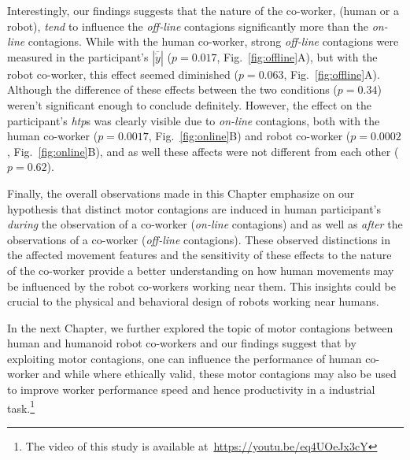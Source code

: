 Interestingly, our findings suggests that the nature of the co-worker, (human or a robot), \textit{tend} to influence the \textit{off-line} contagions significantly more than the \textit{on-line} contagions. While with the human co-worker, strong \textit{off-line} contagions were measured in the participant's $|\overline{\dot{y}}|$ ($p = 0.017$, Fig.~\ref{fig:offline}A), but with the robot co-worker, this effect seemed diminished ($p = 0.063$, Fig.~\ref{fig:offline}A). Although the difference of these effects between the two conditions ($p = 0.34$) weren't significant enough to conclude definitely. However, the effect on the participant's {\it htp}s was clearly visible due to \textit{on-line} contagions, both with the human co-worker ($p = 0.0017$, Fig.~\ref{fig:online}B) and robot co-worker ($p = 0.0002$, Fig.~\ref{fig:online}B), and as well these affects were not different from each other ($p = 0.62$).

Finally, the overall observations made in this Chapter emphasize on our hypothesis that distinct motor contagions are induced in human participant's \emph{during} the observation of a co-worker (\textit{on-line} contagions) and as well as \emph{after} the observations of a co-worker (\textit{off-line} contagions). These observed distinctions in the affected movement features and the sensitivity of these effects to the nature of the co-worker provide a better understanding on how human movements may be influenced by the robot co-workers working near them. This insights could be crucial to the physical and behavioral design of robots working near humans.


In the next Chapter, we further explored the topic of motor contagions between human and humanoid robot co-workers and our findings suggest that by exploiting motor contagions, one can influence the performance of human co-worker and while where ethically valid, these motor contagions may also be used to improve worker performance speed and hence productivity in a industrial task.\footnote{The video of this study is available at~\url{https://youtu.be/eq4UOeJx3cY}}



\clearpage %